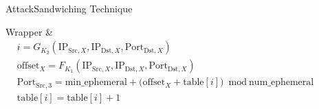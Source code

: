 \documentclass[aspectratio=169, hyperref={colorlinks=true, allcolors=SecondaryColor}, c]{beamer}
\begin{document}
\begin{frame}[fragile]{Attack}{Sandwiching Technique}
\begin{center}
\begin{adjustbox}{max height=0.8\textheight, max width=0.8\textwidth}
\begin{tblr}
				Wrapper       &
				\(
				\begin{aligned}
					 & i = G_{K_2}(\text{IP}_{\text{Src},X}, \text{IP}_{\text{Dst},X}, \text{Port}_{\text{Dst},X})                                    \\
					 & \text{offset}_X = F_{K_1}(\text{IP}_{\text{Src},X}, \text{IP}_{\text{Dst},X}, \text{Port}_{\text{Dst},X})                      \\
					 & \text{Port}_{\text{Src},3} = \text{min\_ephemeral} + \bigl(\text{offset}_X + \text{table}[i] \bigr)\bmod \text{num\_ephemeral} \\
					 & \text{table}[i] = \text{table}[i] + 1
				\end{aligned}
				\)                                   \\
			\end{tblr}
		\end{adjustbox}
	\end{center}
	\begin{tikzpicture}[remember picture, overlay, shift={(current page.south west)}]



\end{tikzpicture}
\end{frame}
\end{document}
